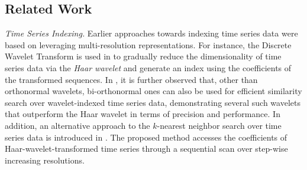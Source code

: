\subsection{Related Work}
\label{sec:related}



\noindent \emph{Time Series Indexing.} Earlier approaches towards indexing time series data were based on leveraging multi-resolution representations. For instance, the Discrete Wavelet Transform \cite{graps1995cse} is used in \cite{chan1999icde} to gradually reduce the dimensionality of time series data via the \emph{Haar wavelet} \cite{haar1910theorie} and generate an index using the coefficients of the transformed sequences. In \cite{popivanov2002icde}, it is further observed that, other than orthonormal wavelets, bi-orthonormal ones can also be used for efficient similarity search over wavelet-indexed time series data, demonstrating several such wavelets that outperform the Haar wavelet in terms of precision and performance. In addition, an alternative approach to the $k$-nearest neighbor search over time series data is introduced in \cite{kashyap2011kdd}. The proposed method accesses the coefficients of Haar-wavelet-transformed time series through a sequential scan over step-wise increasing resolutions.


